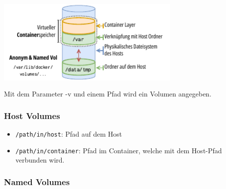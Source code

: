 \documentclass[
  10pt,
  a4paper,
  twocolumn]{article}
\newenvironment{Shaded}{}{}
\newcommand{\AttributeTok}[1]{\textcolor[rgb]{0.84,0.23,0.29}{#1}}
\newcommand{\ExtensionTok}[1]{\textcolor[rgb]{0.84,0.23,0.29}{\textbf{#1}}}
\newcommand{\NormalTok}[1]{\textcolor[rgb]{0.14,0.16,0.18}{#1}}
\newcommand{\OperatorTok}[1]{\textcolor[rgb]{0.14,0.16,0.18}{#1}}
\providecommand{\tightlist}{%
  \setlength{\itemsep}{0pt}\setlength{\parskip}{0pt}}\usepackage{longtable,booktabs,array}
\begin{document}
\begin{center}
\includegraphics[width=9cm,height=\textheight]{images/docker/volume_structure.pdf}
\end{center}

Mit dem Parameter \AttributeTok{{-}v} und einem Pfad wird ein Volumen
angegeben.

\subsubsection{Host Volumes}\label{host-volumes}

\begin{Shaded}
\end{Shaded}

\begin{itemize}
\tightlist
\item
  \texttt{/path/in/host}: Pfad auf dem Host
\item
  \texttt{/path/in/container}: Pfad im Container, welche mit dem
  Host-Pfad verbunden wird.
\end{itemize}

\subsubsection{Named Volumes}\label{named-volumes}

\begin{Shaded}
\end{Shaded}
\end{document}
